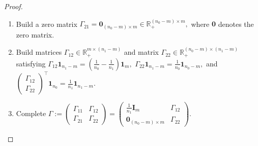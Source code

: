 \documentclass[10pt]{article} %
\begin{document}
\begin{proof}
\begin{enumerate}
                \item Build a zero matrix $\Gamma_{21} = \mathbf{0}_{(n_{0} - m) \times m} \in \mathbb{R}_{+}^{(n_{0} - m) \times m},$ where $\mathbf{0}$ denotes the zero matrix.
                
                \item Build matrices $\Gamma_{12} \in \mathbb{R}_{+}^{m \times (n_{1} - m)}$ and matrix $\Gamma_{22} \in \mathbb{R}_{+}^{(n_{0} - m) \times (n_{1} - m)}$
                satisfying
                $\Gamma_{12} \mathbf{1}_{n_{1} - m} = \left( \frac{1}{n_{0}} - \frac{1}{n_{1}} \right) \mathbf{1}_{m},$
                $\Gamma_{22} \mathbf{1}_{n_{1} - m} = \frac{1}{n_{0}} \mathbf{1}_{n_{0} - m},$
                and
                $\begin{pmatrix}
                    \Gamma_{12} \\ \Gamma_{22}
                \end{pmatrix}^{\top}  \mathbf{1}_{n_{0}} = \frac{1}{n_{1}} \mathbf{1}_{n_{1} - m}.$
                
                \item Complete
                $
                \Gamma := \begin{pmatrix}
                \Gamma_{11} & \Gamma_{12} \\
                \Gamma_{21} & \Gamma_{22}
                \end{pmatrix}
                = \begin{pmatrix}
                \frac{1}{n_1} \mathbf{I}_m & \Gamma_{12} \\
                \mathbf{0}_{(n_0 - m) \times m} & \Gamma_{22}
                \end{pmatrix}.
                $
            \end{enumerate}
            

\end{proof}
\end{document}
